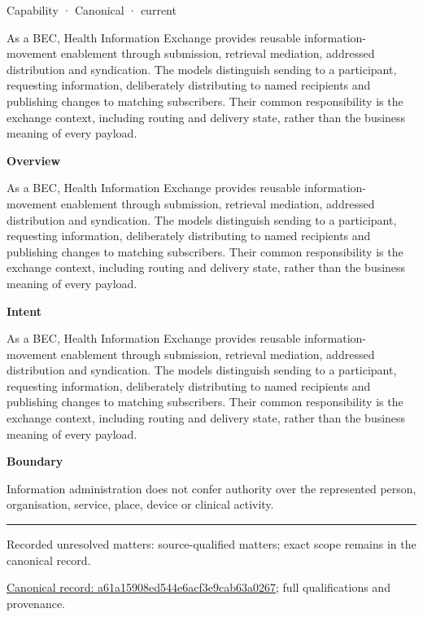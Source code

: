 \label{element:a61a15908ed544e6acf3e9cab63a0267}
{\small Capability · Canonical · current}\par

As a BEC, Health Information Exchange provides reusable information-movement enablement through submission, retrieval mediation, addressed distribution and syndication. The models distinguish sending to a participant, requesting information, deliberately distributing to named recipients and publishing changes to matching subscribers. Their common responsibility is the exchange context, including routing and delivery state, rather than the business meaning of every payload.



\textbf{Overview}



As a BEC, Health Information Exchange provides reusable information-movement enablement through submission, retrieval mediation, addressed distribution and syndication. The models distinguish sending to a participant, requesting information, deliberately distributing to named recipients and publishing changes to matching subscribers. Their common responsibility is the exchange context, including routing and delivery state, rather than the business meaning of every payload.



\textbf{Intent}



As a BEC, Health Information Exchange provides reusable information-movement enablement through submission, retrieval mediation, addressed distribution and syndication. The models distinguish sending to a participant, requesting information, deliberately distributing to named recipients and publishing changes to matching subscribers. Their common responsibility is the exchange context, including routing and delivery state, rather than the business meaning of every payload.



\textbf{Boundary}



Information administration does not confer authority over the represented person, organisation, service, place, device or clinical activity.



\medskip\hrule\medskip

{\small Recorded unresolved matters: source-qualified matters; exact scope remains in the canonical record.}\par
{\footnotesize \href{../../../../continuum/strategy/capability/a61a15908ed544e6acf3e9cab63a0267.md}{Canonical record: a61a15908ed544e6acf3e9cab63a0267}; full qualifications and provenance.}\par
